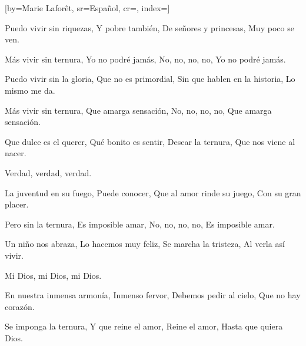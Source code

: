 [by={Marie Laforêt},
                     sr={Español},
                     cr={},
                     index={}]

\beginverse
Puedo vivir sin riquezas,
Y pobre también,
De señores y princesas,
Muy poco se ven.
\endverse


\beginverse
Más vivir sin ternura,
Yo no podré jamás,
No, no, no, no,
Yo no podré jamás.
\endverse

\beginverse
Puedo vivir sin la gloria,
Que no es primordial,
Sin que hablen en la historia,
Lo mismo me da.
\endverse

\beginverse
Más vivir sin ternura,
Que amarga sensación,
No, no, no, no,
Que amarga sensación.
\endverse

\beginverse
Que dulce es el querer,
Qué bonito es sentir,
Desear la ternura,
Que nos viene al nacer.
\endverse

\beginverse
 Verdad, verdad, verdad.
\endverse

\beginverse
La juventud en su fuego,
Puede conocer,
Que al amor rinde su juego,
Con su gran placer.
\endverse

\beginverse
Pero sin la ternura,
Es imposible amar,
No, no, no, no,
Es imposible amar.
\endverse

\beginverse
Un niño nos abraza,
Lo hacemos muy feliz,
Se marcha la tristeza,
Al verla así vivir.
\endverse

\beginverse
 Mi Dios, mi Dios, mi Dios.
\endverse

\beginverse
En nuestra inmensa armonía,
Inmenso fervor,
Debemos pedir al cielo,
Que no hay corazón.
\endverse

\beginverse
Se imponga la ternura,
Y que reine el amor,
Reine el amor,
Hasta que quiera Dios. 
\endverse


\endsong